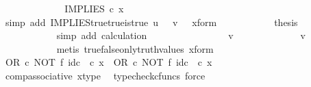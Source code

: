 \begin{isabellebody}
\ \ \ \ \ \ \ \ \isamarkupfalse%
\ \isamarkupfalse%
\ {\isachardoublequoteopen}{\isachardot}{\kern0pt}{\isachardot}{\kern0pt}{\isachardot}{\kern0pt}\ {\isacharequal}{\kern0pt}\ IMPLIES\ {\isasymcirc}\isactrlsub c\ x{\isachardoublequoteclose}\isanewline
\ \ \ \ \ \ \ \ \ \ \isamarkupfalse%
\ {\isacharparenleft}{\kern0pt}simp\ add{\isacharcolon}{\kern0pt}\ IMPLIES{\isacharunderscore}{\kern0pt}true{\isacharunderscore}{\kern0pt}true{\isacharunderscore}{\kern0pt}is{\isacharunderscore}{\kern0pt}true\ {\isacartoucheopen}u\ {\isacharequal}{\kern0pt}\ {\isasymt}{\isacartoucheclose}\ {\isacartoucheopen}v\ {\isacharequal}{\kern0pt}\ {\isasymt}{\isacartoucheclose}\ x{\isacharunderscore}{\kern0pt}form{\isacharparenright}{\kern0pt}\isanewline
\ \ \ \ \ \ \ \ \isamarkupfalse%
\ \isamarkupfalse%
\ {\isacharquery}{\kern0pt}thesis\isanewline
\ \ \ \ \ \ \ \ \ \ \isamarkupfalse%
\ {\isacharparenleft}{\kern0pt}simp\ add{\isacharcolon}{\kern0pt}\ calculation{\isacharparenright}{\kern0pt}\isanewline
\ \ \ \ \ \ \isamarkupfalse%
\isanewline
\ \ \ \ \ \ \ \ \isamarkupfalse%
\ {\isachardoublequoteopen}v\ {\isasymnoteq}\ {\isasymt}{\isachardoublequoteclose}\isanewline
\ \ \ \ \ \ \ \ \isamarkupfalse%
\ \isamarkupfalse%
\ {\isachardoublequoteopen}v\ {\isacharequal}{\kern0pt}\ {\isasymf}{\isachardoublequoteclose}\isanewline
\ \ \ \ \ \ \ \ \ \ \isamarkupfalse%
\ {\isacharparenleft}{\kern0pt}metis\ true{\isacharunderscore}{\kern0pt}false{\isacharunderscore}{\kern0pt}only{\isacharunderscore}{\kern0pt}truth{\isacharunderscore}{\kern0pt}values\ x{\isacharunderscore}{\kern0pt}form{\isacharparenright}{\kern0pt}\isanewline
\ \ \ \ \ \ \ \ \isamarkupfalse%
\ {\isachardoublequoteopen}{\isacharparenleft}{\kern0pt}OR\ {\isasymcirc}\isactrlsub c\ NOT\ {\isasymtimes}\isactrlsub f\ id\isactrlsub c\ {\isasymOmega}{\isacharparenright}{\kern0pt}\ {\isasymcirc}\isactrlsub c\ x\ {\isacharequal}{\kern0pt}\ OR\ {\isasymcirc}\isactrlsub c\ {\isacharparenleft}{\kern0pt}NOT\ {\isasymtimes}\isactrlsub f\ id\isactrlsub c\ {\isasymOmega}{\isacharparenright}{\kern0pt}\ {\isasymcirc}\isactrlsub c\ x{\isachardoublequoteclose}\isanewline
\ \ \ \ \ \ \ \ \ \ \isamarkupfalse%
\ comp{\isacharunderscore}{\kern0pt}associative{}\ x{\isacharunderscore}{\kern0pt}type\ \isamarkupfalse%
\ {\isacharparenleft}{\kern0pt}typecheck{\isacharunderscore}{\kern0pt}cfuncs{\isacharcomma}{\kern0pt}\ force{\isacharparenright}{\kern0pt}\isanewline

\end{isabellebody}
